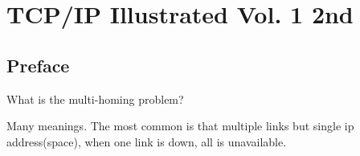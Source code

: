 %
%
%

\chapter{TCP/IP Illustrated Vol. 1 2nd}
\label{intro} %


\section{Preface}
\label{sec:1}

What is the multi-homing problem?

Many meanings. The most common is that multiple links but single ip address(space), when one link is down, all is unavailable.



